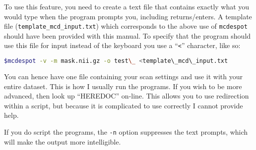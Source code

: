 \documentclass{report}
\begin{document}
To use this feature, you need to create a text file that contains exactly what you would type when the program prompts you, including returns/enters. A template file (\texttt{template\_mcd\_input.txt}) which corresponds to the above use of \texttt{mcdespot} should have been provided with this manual. To specify that the program should use this file for input instead of the keyboard you use a ``\texttt{<}'' character, like so:

\begin{lstlisting}[language=sh]
$mcdespot -v -m mask.nii.gz -o test\_ <template\_mcd\_input.txt
\end{lstlisting}

You can hence have one file containing your scan settings and use it with your entire dataset. This is how I usually run the programs. If you wish to be more advanced, then look up ``HEREDOC'' on-line. This allows you to use redirection within a script, but because it is complicated to use correctly I cannot provide help.

If you do script the programs, the \texttt{-n} option suppresses the text prompts, which will make the output more intelligible.
\end{document}
